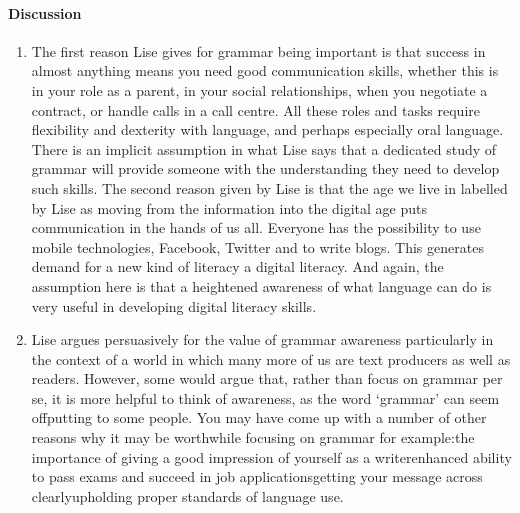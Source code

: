 \documentclass[letterpaper,10pt,english]{sphinxmanual}
\begin{document}
\paragraph{Discussion}
\label{\detokenize{content/session_00/Part_00_01:Discussion}}\begin{enumerate}
%
\item {} 
The first reason Lise gives for grammar being important is that success in almost anything means you need good communication skills, whether this is in your role as a parent, in your social relationships, when you negotiate a contract, or handle calls in a call centre. All these roles and tasks require flexibility and dexterity with language, and perhaps especially oral language. There is an implicit assumption in what Lise says that a dedicated study of grammar will provide someone with the
understanding they need to develop such skills. The second reason given by Lise is that the age we live in \textendash{} labelled by Lise as moving from the information into the digital age \textendash{} puts communication in the hands of us all. Everyone has the possibility to use mobile technologies, Facebook, Twitter and to write blogs. This generates demand for a new kind of literacy \textendash{} a digital literacy. And again, the assumption here is that a heightened awareness of what language can do is very useful in
developing digital literacy skills.

\item {} 
Lise argues persuasively for the value of grammar awareness particularly in the context of a world in which many more of us are text producers as well as readers. However, some would argue that, rather than focus on grammar per se, it is more helpful to think of  awareness, as the word ‘grammar’ can seem off\sphinxhyphen{}putting to some people. You may have come up with a number of other reasons why it may be worthwhile focusing on grammar \textendash{} for example:the importance of giving a good impression
of yourself as a writerenhanced ability to pass exams and succeed in job applicationsgetting your message across clearlyupholding proper standards of language use.

\end{enumerate}
\end{document}
